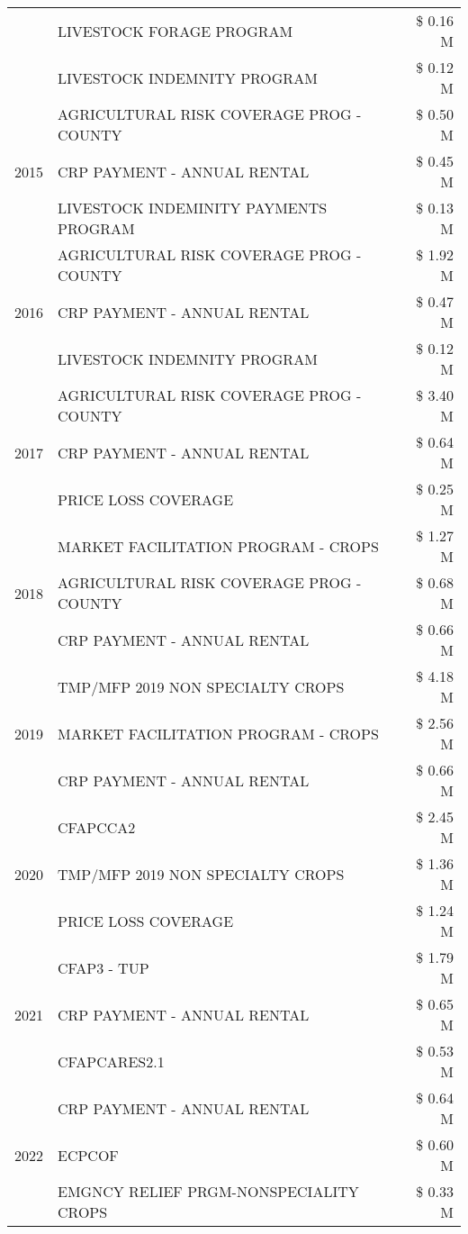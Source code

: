 \begin{tabular}{llr}
 & LIVESTOCK FORAGE PROGRAM & \$ 0.16 M \\
 & LIVESTOCK INDEMNITY PROGRAM & \$ 0.12 M \\
\cline{1-3}
\multirow[t]{3}{*}{2015} & AGRICULTURAL RISK COVERAGE PROG - COUNTY & \$ 0.50 M \\
 & CRP PAYMENT - ANNUAL RENTAL & \$ 0.45 M \\
 & LIVESTOCK INDEMINITY PAYMENTS PROGRAM & \$ 0.13 M \\
\cline{1-3}
\multirow[t]{3}{*}{2016} & AGRICULTURAL RISK COVERAGE PROG - COUNTY & \$ 1.92 M \\
 & CRP PAYMENT - ANNUAL RENTAL & \$ 0.47 M \\
 & LIVESTOCK INDEMNITY PROGRAM & \$ 0.12 M \\
\cline{1-3}
\multirow[t]{3}{*}{2017} & AGRICULTURAL RISK COVERAGE PROG - COUNTY & \$ 3.40 M \\
 & CRP PAYMENT - ANNUAL RENTAL & \$ 0.64 M \\
 & PRICE LOSS COVERAGE & \$ 0.25 M \\
\cline{1-3}
\multirow[t]{3}{*}{2018} & MARKET FACILITATION PROGRAM - CROPS & \$ 1.27 M \\
 & AGRICULTURAL RISK COVERAGE PROG - COUNTY & \$ 0.68 M \\
 & CRP PAYMENT - ANNUAL RENTAL & \$ 0.66 M \\
\cline{1-3}
\multirow[t]{3}{*}{2019} & TMP/MFP 2019 NON SPECIALTY CROPS & \$ 4.18 M \\
 & MARKET FACILITATION PROGRAM - CROPS & \$ 2.56 M \\
 & CRP PAYMENT - ANNUAL RENTAL & \$ 0.66 M \\
\cline{1-3}
\multirow[t]{3}{*}{2020} & CFAPCCA2 & \$ 2.45 M \\
 & TMP/MFP 2019 NON SPECIALTY CROPS & \$ 1.36 M \\
 & PRICE LOSS COVERAGE & \$ 1.24 M \\
\cline{1-3}
\multirow[t]{3}{*}{2021} & CFAP3 - TUP & \$ 1.79 M \\
 & CRP PAYMENT - ANNUAL RENTAL & \$ 0.65 M \\
 & CFAPCARES2.1 & \$ 0.53 M \\
\cline{1-3}
\multirow[t]{3}{*}{2022} & CRP PAYMENT - ANNUAL RENTAL & \$ 0.64 M \\
 & ECPCOF & \$ 0.60 M \\
 & EMGNCY RELIEF PRGM-NONSPECIALITY CROPS & \$ 0.33 M \\
\cline{1-3}
\bottomrule
\end{tabular}
